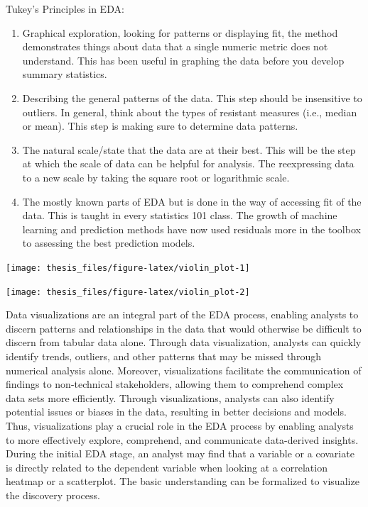 \documentclass[print]{nuthesis}
\begin{document}
Tukey's Principles in EDA:

\begin{enumerate}
\def\labelenumi{\arabic{enumi}.}
\item
  Graphical exploration, looking for patterns or displaying fit, the method demonstrates things about data that a single numeric metric does not understand.
  This has been useful in graphing the data before you develop summary statistics.
\item
  Describing the general patterns of the data.
  This step should be insensitive to outliers.
  In general, think about the types of resistant measures (i.e., median or mean).
  This step is making sure to determine data patterns.
\item
  The natural scale/state that the data are at their best.
  This will be the step at which the scale of data can be helpful for analysis.
  The reexpressing data to a new scale by taking the square root or logarithmic scale.
\item
  The mostly known parts of EDA but is done in the way of accessing fit of the data.
  This is taught in every statistics 101 class.
  The growth of machine learning and prediction methods have now used residuals more in the toolbox to assessing the best prediction models.
\end{enumerate}

\begin{center}\texttt{[image: thesis\_files/figure-latex/violin\_plot-1]} \end{center}

\begin{center}\texttt{[image: thesis\_files/figure-latex/violin\_plot-2]} \end{center}

Data visualizations are an integral part of the EDA process, enabling analysts to discern patterns and relationships in the data that would otherwise be difficult to discern from tabular data alone.
Through data visualization, analysts can quickly identify trends, outliers, and other patterns that may be missed through numerical analysis alone.
Moreover, visualizations facilitate the communication of findings to non-technical stakeholders, allowing them to comprehend complex data sets more efficiently.
Through visualizations, analysts can also identify potential issues or biases in the data, resulting in better decisions and models.
Thus, visualizations play a crucial role in the EDA process by enabling analysts to more effectively explore, comprehend, and communicate data-derived insights.
During the initial EDA stage, an analyst may find that a variable or a covariate is directly related to the dependent variable when looking at a correlation heatmap or a scatterplot.
The basic understanding can be formalized to visualize the discovery process.
\end{document}
